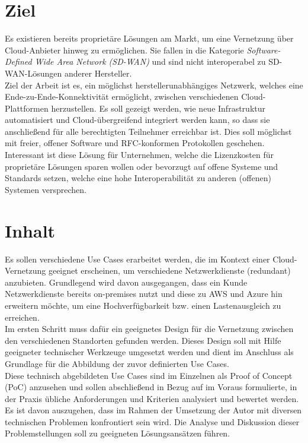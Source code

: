 \section{Ziel}

Es existieren bereits proprietäre Lösungen am Markt, um eine Vernetzung über Cloud-Anbieter hinweg zu ermöglichen. Sie fallen in die Kategorie \textit{Software-Defined Wide Area Network (SD-WAN)} und sind nicht interoperabel zu \gls{SD-WAN}-Lösungen anderer Hersteller.\\
Ziel der Arbeit ist es, ein möglichst herstellerunabhängiges Netzwerk, welches eine Ende-zu-Ende-Konnektivität ermöglicht, zwischen verschiedenen Cloud-Plattformen herzustellen. Es soll gezeigt werden, wie neue Infrastruktur automatisiert und Cloud-übergreifend integriert werden kann, so dass sie anschließend für alle berechtigten Teilnehmer erreichbar ist. Dies soll möglichst mit freier, offener Software und \gls{RFC}-konformen Protokollen geschehen.\\
Interessant ist diese Lösung für Unternehmen, welche die Lizenzkosten für proprietäre Lösungen sparen wollen oder bevorzugt auf offene Systeme und Standards setzen, welche eine hohe Interoperabilität zu anderen (offenen) Systemen versprechen.

\section{Inhalt}
Es sollen verschiedene Use Cases erarbeitet werden, die im Kontext einer Cloud-Vernetzung geeignet erscheinen, um verschiedene Netzwerkdienste (redundant) anzubieten. Grundlegend wird davon ausgegangen, dass ein Kunde Netzwerkdienste bereits \gls{on-premises} nutzt und diese zu AWS und Azure hin erweitern möchte, um eine Hochverfügbarkeit bzw. einen Lastenausgleich zu erreichen.\\
Im ersten Schritt muss dafür ein geeignetes Design für die Vernetzung zwischen den verschiedenen Standorten gefunden werden. Dieses Design soll mit Hilfe geeigneter technischer Werkzeuge umgesetzt werden und dient im Anschluss als Grundlage für die Abbildung der zuvor definierten Use Cases.\\
Diese technisch abgebildeten Use Cases sind im Einzelnen als Proof of Concept (PoC) anzusehen und sollen abschließend in Bezug auf im Voraus formulierte, in der Praxis übliche Anforderungen und Kriterien analysiert und bewertet werden. Es ist davon auszugehen, dass im Rahmen der Umsetzung der Autor mit diversen technischen Problemen konfrontiert sein wird. Die Analyse und Diskussion dieser Problemstellungen soll zu geeigneten Lösungsansätzen führen.

